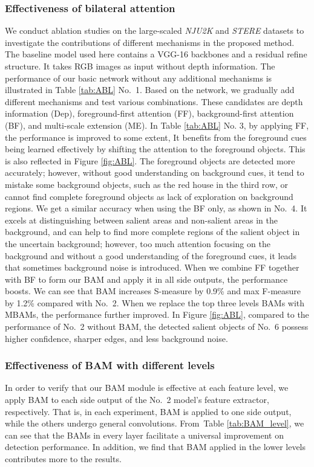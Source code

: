 \documentclass[journal]{IEEEtran}
\newcommand{\tabref}[1]{Table \ref{#1}}
\newcommand{\figref}[1]{Figure \ref{#1}}
\begin{document}
\subsubsection{Effectiveness of bilateral attention}
We conduct ablation studies on the large-scaled \textit{NJU2K} and \textit{STERE} datasets to investigate the contributions of different mechanisms in the proposed method.
The baseline model used here contains a VGG-16 backbones and a residual refine structure.
It takes RGB images as input without depth information.
The performance of our basic network without any additional mechanisms is illustrated in \tabref{tab:ABL} No.\ 1.
Based on the network, we gradually add different mechanisms and test various combinations.
These candidates are depth information (Dep), foreground-first attention (FF), background-first attention (BF), and multi-scale extension (ME).
In \tabref{tab:ABL} No. 3,
by applying FF, the performance is improved to some extent, 
It benefits from the foreground cues being learned effectively by shifting the attention to the foreground objects.
This is also reflected in \figref{fig:ABL}.
The foreground objects are detected more accurately;
however, without good understanding on background cues,
it tend to mistake some background objects, such as the red house in the third row, 
or cannot find complete foreground objects as lack of exploration on background regions.
We get a similar accuracy when using the BF only, as shown in No.\ 4.
It excels at distinguishing between salient areas and non-salient areas in the background, 
and can help to find more complete regions of the salient object in the uncertain background;
however, 
too much attention focusing on the background and without a good understanding of the foreground cues, 
it leads that sometimes background noise is introduced.
When we combine FF together with BF to form our BAM and apply it in all side outputs, the performance boosts.
We can see that BAM increases S-measure by 0.9\% and max F-measure by 1.2\% compared with No.\ 2.
When we replace the top three levels BAMs with MBAMs, 
the performance further improved.
In \figref{fig:ABL}, 
compared to the performance of No.\ 2 without BAM, the detected salient objects of No.\ 6 possess higher confidence, sharper edges, and less background noise.

\subsubsection{Effectiveness of BAM with different levels}
In order to verify that our BAM module is effective at each feature level,
we apply BAM to each side output of the No.\ 2 model's feature extractor, respectively. 
That is, in each experiment, BAM is applied to one side output, while the others undergo general convolutions.
From~\tabref{tab:BAM_level},
we can see that the BAMs in every layer facilitate a universal improvement on detection performance.
In addition, we find that BAM applied in the lower levels contributes more to the results.
\end{document}
